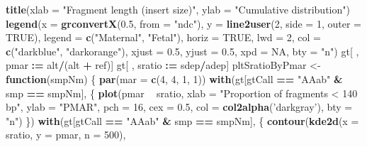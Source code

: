 \documentclass[11pt,letterpaper]{book}
\newenvironment{Shaded}{\begin{snugshade}}{\end{snugshade}}
\newcommand{\ControlFlowTok}[1]{\textcolor[rgb]{0.13,0.29,0.53}{\textbf{#1}}}
\newcommand{\DataTypeTok}[1]{\textcolor[rgb]{0.13,0.29,0.53}{#1}}
\newcommand{\DecValTok}[1]{\textcolor[rgb]{0.00,0.00,0.81}{#1}}
\newcommand{\ErrorTok}[1]{\textcolor[rgb]{0.64,0.00,0.00}{\textbf{#1}}}
\newcommand{\FloatTok}[1]{\textcolor[rgb]{0.00,0.00,0.81}{#1}}
\newcommand{\KeywordTok}[1]{\textcolor[rgb]{0.13,0.29,0.53}{\textbf{#1}}}
\newcommand{\NormalTok}[1]{#1}
\newcommand{\OperatorTok}[1]{\textcolor[rgb]{0.81,0.36,0.00}{\textbf{#1}}}
\newcommand{\OtherTok}[1]{\textcolor[rgb]{0.56,0.35,0.01}{#1}}
\newcommand{\StringTok}[1]{\textcolor[rgb]{0.31,0.60,0.02}{#1}}
\begin{document}
\begin{Shaded}
\begin{Highlighting}[]
{{{{{{{{{{{{{{{{{{{{{{\KeywordTok{title}\NormalTok{(}\DataTypeTok{xlab =} \StringTok{"Fragment length (insert size)"}\NormalTok{,}
      \DataTypeTok{ylab =} \StringTok{"Cumulative distribution"}\NormalTok{)}
\KeywordTok{legend}\NormalTok{(}\DataTypeTok{x =} \KeywordTok{grconvertX}\NormalTok{(}\FloatTok{0.5}\NormalTok{, }\DataTypeTok{from =} \StringTok{"ndc"}\NormalTok{),}
       \DataTypeTok{y =} \KeywordTok{line2user}\NormalTok{(}\DecValTok{2}\NormalTok{, }\DataTypeTok{side =} \DecValTok{1}\NormalTok{, }\DataTypeTok{outer =} \OtherTok{TRUE}\NormalTok{),}
       \DataTypeTok{legend =} \KeywordTok{c}\NormalTok{(}\StringTok{"Maternal"}\NormalTok{, }\StringTok{"Fetal"}\NormalTok{),}
       \DataTypeTok{horiz =} \OtherTok{TRUE}\NormalTok{,}
       \DataTypeTok{lwd =} \DecValTok{2}\NormalTok{,}
       \DataTypeTok{col =} \KeywordTok{c}\NormalTok{(}\StringTok{"darkblue"}\NormalTok{, }\StringTok{"darkorange"}\NormalTok{),}
       \DataTypeTok{xjust =} \FloatTok{0.5}\NormalTok{,}
       \DataTypeTok{yjust =} \FloatTok{0.5}\NormalTok{,}
       \DataTypeTok{xpd =} \OtherTok{NA}\NormalTok{,}
       \DataTypeTok{bty =} \StringTok{"n"}\NormalTok{)}
\NormalTok{gt[ , pmar }\OperatorTok{:}\ErrorTok{=}\StringTok{ }\NormalTok{alt}\OperatorTok{/}\NormalTok{(alt }\OperatorTok{+}\StringTok{ }\NormalTok{ref)]}
\NormalTok{gt[ , sratio }\OperatorTok{:}\ErrorTok{=}\StringTok{ }\NormalTok{sdep}\OperatorTok{/}\NormalTok{adep]}
\NormalTok{pltSratioByPmar <-}\StringTok{ }\ControlFlowTok{function}\NormalTok{(smpNm) \{}
  \KeywordTok{par}\NormalTok{(}\DataTypeTok{mar =} \KeywordTok{c}\NormalTok{(}\DecValTok{4}\NormalTok{, }\DecValTok{4}\NormalTok{, }\DecValTok{1}\NormalTok{, }\DecValTok{1}\NormalTok{))}
  \KeywordTok{with}\NormalTok{(gt[gtCall }\OperatorTok{==}\StringTok{ "AAab"} \OperatorTok{&}\StringTok{ }\NormalTok{smp }\OperatorTok{==}\StringTok{ }\NormalTok{smpNm], \{}
    \KeywordTok{plot}\NormalTok{(pmar }\OperatorTok{~}\StringTok{ }\NormalTok{sratio,}
         \DataTypeTok{xlab =} \StringTok{"Proportion of fragments < 140 bp"}\NormalTok{,}
         \DataTypeTok{ylab =} \StringTok{"PMAR"}\NormalTok{,}
         \DataTypeTok{pch =} \DecValTok{16}\NormalTok{,}
         \DataTypeTok{cex =} \FloatTok{0.5}\NormalTok{,}
         \DataTypeTok{col =} \KeywordTok{col2alpha}\NormalTok{(}\StringTok{'darkgray'}\NormalTok{),}
         \DataTypeTok{bty =} \StringTok{"n"}\NormalTok{)}
\NormalTok{  \})}
  \KeywordTok{with}\NormalTok{(gt[gtCall }\OperatorTok{==}\StringTok{ "AAab"} \OperatorTok{&}\StringTok{ }\NormalTok{smp }\OperatorTok{==}\StringTok{ }\NormalTok{smpNm], \{}
    \KeywordTok{contour}\NormalTok{(}\KeywordTok{kde2d}\NormalTok{(}\DataTypeTok{x =}\NormalTok{ sratio, }\DataTypeTok{y =}\NormalTok{ pmar, }\DataTypeTok{n =} \DecValTok{500}\NormalTok{),}
}}}}}}}}}}}}}}}}}}}}}}
\end{Highlighting}
\end{Shaded}
\end{document}
